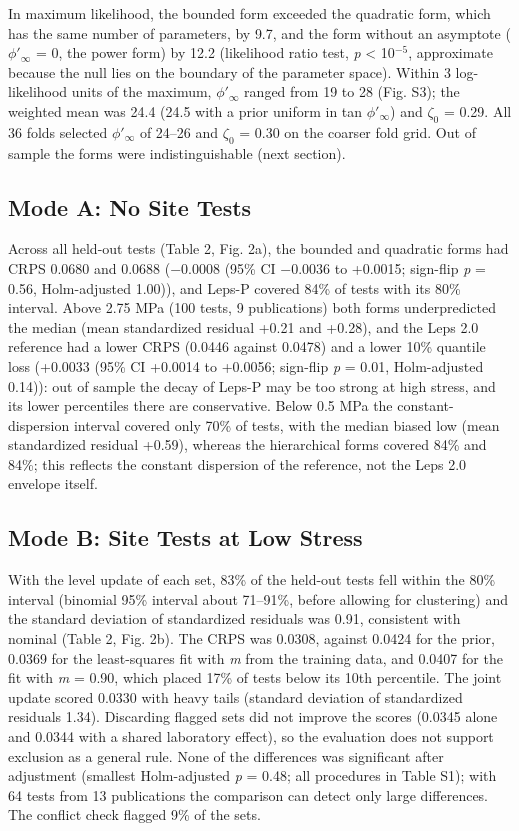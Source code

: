 \documentclass[Journal,letterpaper]{ascelike-new}
\begin{document}
In maximum likelihood, the bounded form exceeded the quadratic form, which has the same number of parameters, by 9.7, and the form without an asymptote ($\phi'_\infty$ = 0, the power form) by 12.2 (likelihood ratio test, \textit{p} < 10$^{-5}$, approximate because the null lies on the boundary of the parameter space). Within 3 log-likelihood units of the maximum, $\phi'_\infty$ ranged from 19\textdegree{} to 28\textdegree{} (Fig. S3); the weighted mean was 24.4\textdegree{} (24.5\textdegree{} with a prior uniform in tan $\phi'_\infty$) and $\zeta_0$ = 0.29. All 36 folds selected $\phi'_\infty$ of 24--26\textdegree{} and $\zeta_0$ = 0.30 on the coarser fold grid. Out of sample the forms were indistinguishable (next section).

\subsection{Mode A: No Site Tests}
Across all held-out tests (Table 2, Fig. 2a), the bounded and quadratic forms had CRPS 0.0680 and 0.0688 ($-$0.0008 (95\% CI $-$0.0036 to +0.0015; sign-flip \textit{p} = 0.56, Holm-adjusted 1.00)), and Leps-P covered 84\% of tests with its 80\% interval. Above 2.75 MPa (100 tests, 9 publications) both forms underpredicted the median (mean standardized residual +0.21 and +0.28), and the Leps 2.0 reference had a lower CRPS (0.0446 against 0.0478) and a lower 10\% quantile loss (+0.0033 (95\% CI +0.0014 to +0.0056; sign-flip \textit{p} = 0.01, Holm-adjusted 0.14)): out of sample the decay of Leps-P may be too strong at high stress, and its lower percentiles there are conservative. Below 0.5 MPa the constant-dispersion interval covered only 70\% of tests, with the median biased low (mean standardized residual +0.59), whereas the hierarchical forms covered 84\% and 84\%; this reflects the constant dispersion of the reference, not the Leps 2.0 envelope itself.

\subsection{Mode B: Site Tests at Low Stress}
With the level update of each set, 83\% of the held-out tests fell within the 80\% interval (binomial 95\% interval about 71--91\%, before allowing for clustering) and the standard deviation of standardized residuals was 0.91, consistent with nominal (Table 2, Fig. 2b). The CRPS was 0.0308, against 0.0424 for the prior, 0.0369 for the least-squares fit with \textit{m} from the training data, and 0.0407 for the fit with \textit{m} = 0.90, which placed 17\% of tests below its 10th percentile. The joint update scored 0.0330 with heavy tails (standard deviation of standardized residuals 1.34). Discarding flagged sets did not improve the scores (0.0345 alone and 0.0344 with a shared laboratory effect), so the evaluation does not support exclusion as a general rule. None of the differences was significant after adjustment (smallest Holm-adjusted \textit{p} = 0.48; all procedures in Table S1); with 64 tests from 13 publications the comparison can detect only large differences. The conflict check flagged 9\% of the sets.
\end{document}
